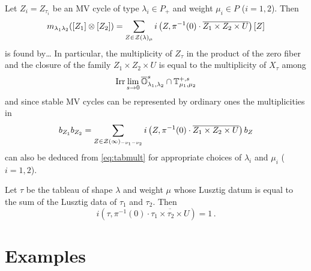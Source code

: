 \documentclass[draft]{article}
\begin{document}
\begin{proposition}
    Let $Z_{i} = Z_{\tau_i}$  be an MV cycle of type $\lambda_i\in P_+$ and weight $\mu_i\in P$ ($i = 1,2$). Then 
    \begin{equation}
        m_{\lambda_1\lambda_2} ([Z_1]\otimes[Z_2]) = \sum_{Z\in\mathcal Z(\lambda)_\mu} i\left(
            Z,\pi^{-1}(0)\cdot\overline{Z_1\times Z_2\times U}
        \right) [Z]
    \end{equation}
    is found by\dots 
    In particular, the multiplicity of $Z_\tau$ in the product of the zero fiber 
    and the 
    closure of the family $Z_1 \times Z_2 \times U$ is equal to the multiplicity of $X_\tau$ among 
    \begin{equation}\label{eq:tabmult}
        \operatorname{Irr} \lim_{s\to 0} \overline{\mathbb O}^s_{\lambda_1,\lambda_2} \cap \mathbb T_{\mu_1,\mu_2}^{+,s}
    \end{equation}
    and since stable MV cycles can be represented by ordinary ones the multiplicities in 
    $$
    b_{Z_1}b_{Z_2} = \sum_{Z\in\mathcal Z(\infty)_{-\nu_1 - \nu_2}} i \left(
        Z, \pi^{-1}(0) \cdot \overline{Z_1 \times Z_2 \times U}
    \right) b_Z 
    $$
    can also be deduced from \cref{eq:tabmult} for appropriate choices of $\lambda_i$ and $\mu_i$ ($i = 1,2$).
\end{proposition}

\begin{conjecture}
    Let $\tau$ be the tableau of shape $\lambda$ and weight $\mu$ whose Lusztig datum is equal to the sum of the Lusztig data of $\tau_1$ and $\tau_2$. 
    Then 
    \begin{equation}
        i(\tau, \pi^{-1}(0) \cdot \overline{\tau_1 \times \tau_2 \times U}) = 1 \,. 
    \end{equation}
\end{conjecture}

\appendix
\section{Examples}
\end{document}
